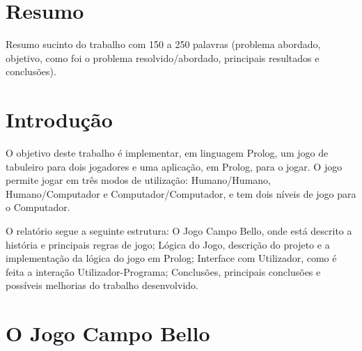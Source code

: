 \documentclass[a4paper]{article}
\begin{document}

\newpage

\section*{Resumo}
Resumo sucinto do trabalho com 150 a 250 palavras (problema abordado, objetivo, como foi o problema resolvido/abordado, principais resultados e conclusões).

\newpage

\tableofcontents



\newpage

\section{Introdução}

O objetivo deste trabalho é implementar, em linguagem Prolog, um jogo de tabuleiro para dois jogadores e uma aplicação, em Prolog, para o jogar. O jogo permite jogar em três modos de utilização: Humano/Humano, Humano/Computador e Computador/Computador, e tem dois níveis de jogo para o Computador. 

O relatório segue a seguinte estrutura: O Jogo Campo Bello, onde está descrito a história e principais regras de jogo; Lógica do Jogo, descrição do projeto e a implementação da lógica do jogo em Prolog; Interface com Utilizador, como é feita a interação Utilizador-Programa; Conclusões, principais conclusões e possíveis melhorias do trabalho desenvolvido.


\section{O Jogo Campo Bello}
\end{document}

